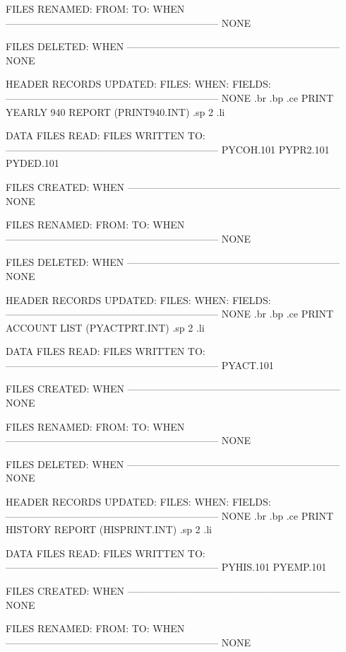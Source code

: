 FILES RENAMED:
  FROM:        TO:		  WHEN
-----------------------------------------------------------------
       NONE


FILES DELETED:			  WHEN
-----------------------------------------------------------------
       NONE


HEADER RECORDS UPDATED:
FILES:		 WHEN:		    FIELDS:
-----------------------------------------------------------------
      NONE
.br
.bp
.ce
PRINT YEARLY 940 REPORT  (PRINT940.INT)
.sp 2
.li

DATA FILES READ:		   FILES WRITTEN TO:
-----------------------------------------------------------------
       PYCOH.101			PYPR2.101
       PYDED.101

FILES CREATED:			  WHEN
-----------------------------------------------------------------
       NONE


FILES RENAMED:
  FROM:        TO:		  WHEN
-----------------------------------------------------------------
       NONE


FILES DELETED:			  WHEN
-----------------------------------------------------------------
       NONE


HEADER RECORDS UPDATED:
FILES:		 WHEN:		    FIELDS:
-----------------------------------------------------------------
      NONE
.br
.bp
.ce
PRINT ACCOUNT LIST  (PYACTPRT.INT)
.sp 2
.li

DATA FILES READ:		   FILES WRITTEN TO:
-----------------------------------------------------------------
       PYACT.101

FILES CREATED:			  WHEN
-----------------------------------------------------------------
       NONE


FILES RENAMED:
  FROM:        TO:		  WHEN
-----------------------------------------------------------------
       NONE


FILES DELETED:			  WHEN
-----------------------------------------------------------------
       NONE


HEADER RECORDS UPDATED:
FILES:		 WHEN:		    FIELDS:
-----------------------------------------------------------------
      NONE
.br
.bp
.ce
PRINT HISTORY REPORT  (HISPRINT.INT)
.sp 2
.li

DATA FILES READ:		   FILES WRITTEN TO:
-----------------------------------------------------------------
       PYHIS.101
       PYEMP.101

FILES CREATED:			  WHEN
-----------------------------------------------------------------
       NONE


FILES RENAMED:
  FROM:        TO:		  WHEN
-----------------------------------------------------------------
       NONE


